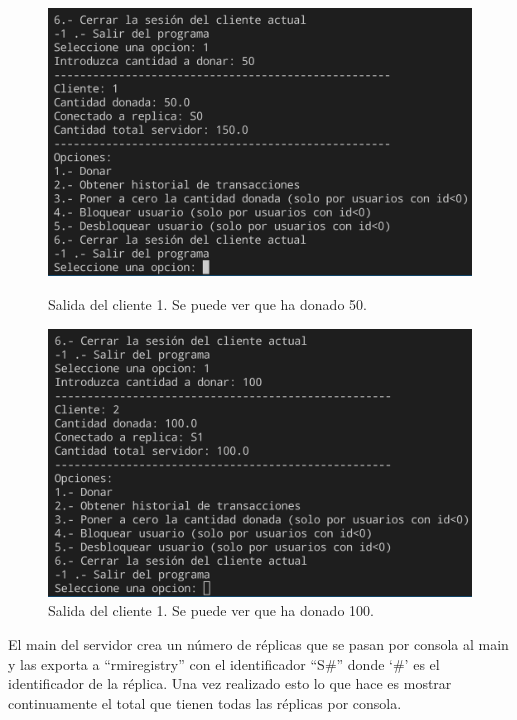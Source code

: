 \documentclass{article}
\begin{document}
\begin{figure}[H]
    \centering
    \begin{minipage}[H]{0.49\textwidth}
        \centering
        \includegraphics[width=\textwidth]{imagenes/donObligatorioC1.png}
        \caption{Salida del cliente 1. Se puede ver que ha donado 50.}        
    \end{minipage}
    \hfill
    \begin{minipage}[H]{0.49\textwidth}
        \centering
        \includegraphics[width=\textwidth]{imagenes/donObligatorioC2.png}
        \caption{Salida del cliente 1. Se puede ver que ha donado 100.}        
    \end{minipage}
\end{figure}

El main del servidor crea un número de réplicas que se pasan por consola al main y las exporta a ``rmiregistry'' con el identificador ``S\#'' donde `\#' es el identificador de la réplica. Una vez realizado esto lo que hace es mostrar continuamente el total que tienen todas las réplicas por consola.
\end{document}
